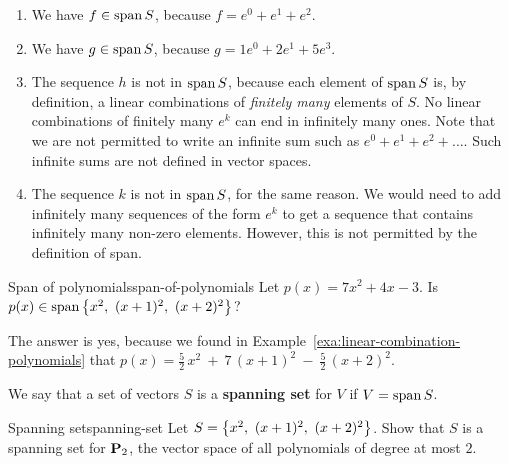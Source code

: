 \begin{solution}
  \begin{enumialphparenastyle}
    \begin{enumerate}
    \item We have $f\in\sspan S$, because $f = e^0 + e^1 + e^2$.
    \item We have $g\in\sspan S$, because $g = 1e^0 + 2e^1 + 5e^3$.
    \item The sequence $h$ is not in $\sspan S$, because each element
      of $\sspan S$ is, by definition, a linear combinations of {\em
        finitely many} elements of $S$. No linear combinations of
      finitely many $e^k$ can end in infinitely many ones. Note that
      we are not permitted to write an infinite sum such as
      $e^0+e^1+e^2+\ldots$. Such infinite sums are not defined in
      vector spaces.
    \item The sequence $k$ is not in $\sspan S$, for the same reason.
      We would need to add infinitely many sequences of the form $e^k$
      to get a sequence that contains infinitely many non-zero
      elements. However, this is not permitted by the definition of
      span.
    \end{enumerate}
  \end{enumialphparenastyle}
  \vspace{-4ex}
\end{solution}

\begin{example}{Span of polynomials}{span-of-polynomials}
  Let $p(x)=7x^2+4x-3$. Is $p(x)\in\sspan\set{x^2,~ (x+1)^2,~ (x+2)^2}$?
\end{example}

\begin{solution}
  The answer is yes, because we found in
  Example~\ref{exa:linear-combination-polynomials} that
  $p(x) = \frac{5}{2}\,x^2 ~+~ 7\,(x+1)^2 ~-~ \frac{5}{2}\,(x+2)^2$.
\end{solution}

We say that a set of vectors $S$ is a \textbf{spanning set}%
%
 for $V$ if $V = \sspan S$.

\begin{example}{Spanning set}{spanning-set}
  Let $S = \left\{x^2,~ (x+1)^2,~ (x+2)^2\right\}$. Show that $S$ is a
  spanning set for $\mathbf{P}_2$, the vector space of all polynomials of
  degree at most $2$.
\end{example}


